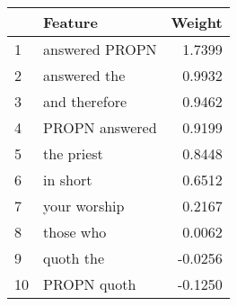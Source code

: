\begin{tabular}{llr}
\toprule
{} &         Feature &  Weight \\
\midrule
1  &  answered PROPN &  1.7399 \\
2  &    answered the &  0.9932 \\
3  &   and therefore &  0.9462 \\
4  &  PROPN answered &  0.9199 \\
5  &      the priest &  0.8448 \\
6  &        in short &  0.6512 \\
7  &    your worship &  0.2167 \\
8  &       those who &  0.0062 \\
9  &       quoth the & -0.0256 \\
10 &     PROPN quoth & -0.1250 \\
\bottomrule
\end{tabular}
